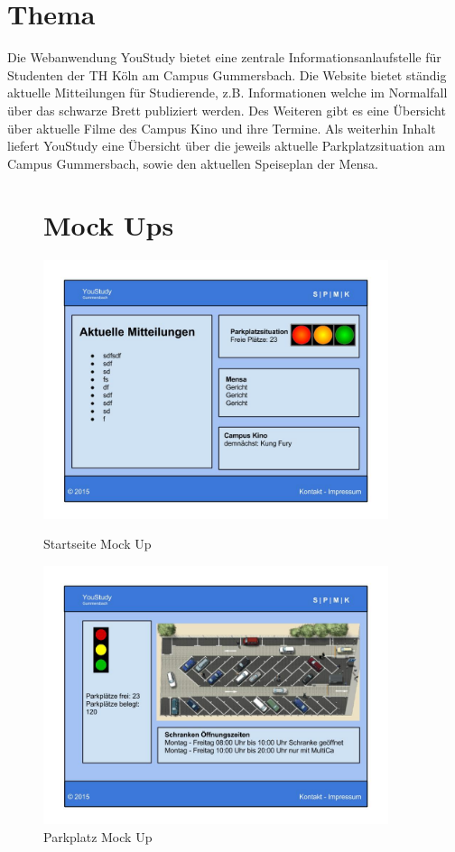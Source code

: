 \chapter{Thema}
Die Webanwendung YouStudy bietet eine zentrale Informationsanlaufstelle für Studenten der TH Köln am Campus Gummersbach. Die Website bietet ständig aktuelle Mitteilungen für Studierende, z.B. Informationen welche im Normalfall über das schwarze Brett publiziert werden. Des Weiteren gibt es eine Übersicht über aktuelle Filme des Campus Kino und ihre Termine. Als weiterhin Inhalt liefert YouStudy eine Übersicht über die jeweils aktuelle Parkplatzsituation am Campus Gummersbach, sowie den aktuellen Speiseplan der Mensa.


\begin{figure}[ht]
\chapter{Mock Ups}
\includegraphics[width=0.9\textwidth]{./img/Startseite}\caption{Startseite Mock Up}\label{fig1}
\includegraphics[width=0.9\textwidth]{./img/Parkplatz}\caption{Parkplatz Mock Up}\label{fig2}
\end{figure}

